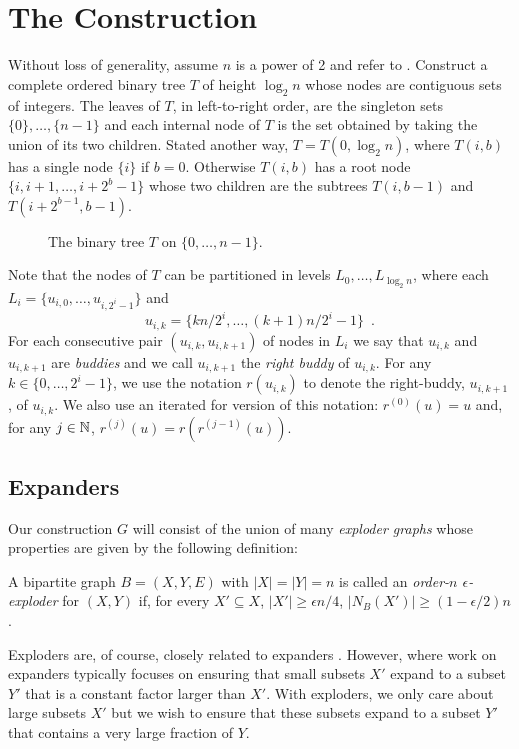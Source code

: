\documentclass{patmorin}
\begin{document}
\section{The Construction}

Without loss of generality, assume $n$ is a power of 2 and refer to
.  Construct a complete ordered binary tree $T$ of height
$\log_2 n$ whose nodes are contiguous sets of integers.  The leaves of
$T$, in left-to-right order, are the singleton sets $\{0\},\ldots,\{n-1\}$
and each internal node of $T$ is the set obtained by taking the union
of its two children.  Stated another way, $T=T(0,\log_2 n)$, where
$T(i,b)$ has a single node $\{i\}$ if $b=0$. Otherwise $T(i,b)$ has
a root node $\{i,i+1,\ldots,i+2^{b}-1\}$ whose two children are the
subtrees $T(i,b-1)$ and $T(i+2^{b-1}, b-1)$.

\begin{figure}
  \caption{The binary tree $T$ on $\{0,\ldots,n-1\}$.}
\end{figure}

Note that the nodes of $T$ can be partitioned in levels $L_0,\ldots,L_{\log_2 n}$, where each $L_i=\{u_{i,0},\ldots,u_{i,2^i-1}\}$ and
\[
  u_{i,k} = \{kn/2^i,\ldots,(k+1)n/2^{i}-1\} \enspace .
\]
For each consecutive pair $(u_{i,k},u_{i,k+1})$ of nodes in $L_i$ we say
that $u_{i,k}$ and $u_{i,k+1}$ are \emph{buddies} and we call $u_{i,k+1}$
the \emph{right buddy} of $u_{i,k}$.  For any $k\in\{0,\ldots,2^{i}-1\}$,
we use the notation $r(u_{i,k})$ to denote the right-buddy, $u_{i,k+1}$,
of $u_{i,k}$.  We also use an iterated for version of this notation:
$r^{(0)}(u)=u$ and, for any $j\in\mathbb{N}$, $r^{(j)}(u)=r(r^{{(j-1)}}(u))$.

\subsection{Expanders}

Our construction $G$ will consist of the union of many \emph{exploder
graphs} whose properties are given by the following definition:

\begin{defn}
   A bipartite graph $B=(X,Y,E)$ with $|X|=|Y|=n$ is called an
   \emph{order-$n$ $\epsilon$-exploder} for $(X,Y)$ if, for
   every $X'\subseteq X$, $|X'|\ge \epsilon n/4$, $|N_B(X')| \ge
   (1-\epsilon/2)n$.
\end{defn}

Exploders are, of course, closely related to expanders \cite{hoory.linial.wigderson:expanders}.  However, where work on expanders typically focuses on ensuring that small subsets $X'$ expand to a subset $Y'$ that is a constant factor larger than $X'$.  With exploders, we only care about large subsets $X'$ but we wish to ensure that these subsets expand to a subset $Y'$ that contains a very large fraction of $Y$.
\end{document}
